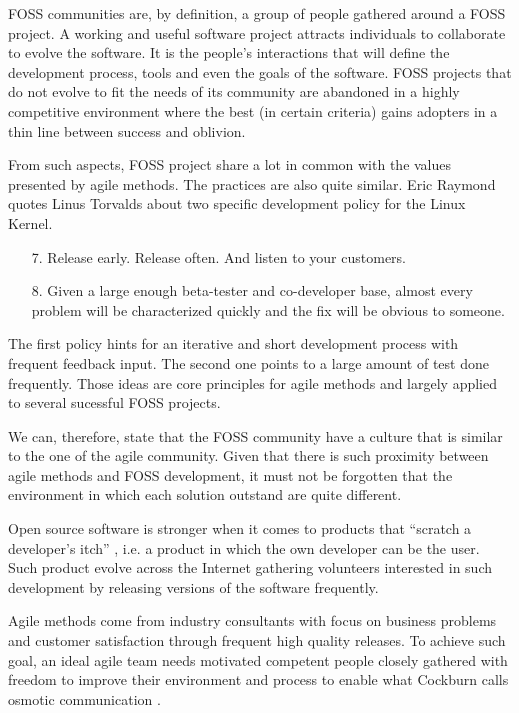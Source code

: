 \documentclass[lnbip]{svmultln}
\begin{document}
FOSS communities are, by definition, a group of people gathered around
a FOSS project. A working and useful software project attracts
individuals to collaborate to evolve the
software\cite{crowston2002}. It is the people's interactions that will
define the development process, tools and even the goals of the
software. FOSS projects that do not evolve to fit the needs of its
community are abandoned in a highly competitive environment where the
best (in certain criteria) gains adopters in a thin line between
success and oblivion.

From such aspects, FOSS project share a lot in common with the values
presented by agile methods. The practices are also quite similar. Eric
Raymond quotes Linus Torvalds about two specific development policy
for the Linux Kernel.
\begin{enumerate}
\item[7.] Release early. Release often. And listen to your customers.
\item[8.] Given a large enough beta-tester and co-developer base,
  almost every problem will be characterized quickly and the fix will
  be obvious to someone.
\end{enumerate}

The first policy hints for an iterative and short development process
with frequent feedback input. The second one points to a large amount
of test done frequently. Those ideas are core principles for agile
methods and largely applied to several sucessful FOSS projects.

We can, therefore, state that the FOSS community have a culture that
is similar to the one of the agile community. Given that there is such
proximity between agile methods and FOSS development, it must not be
forgotten that the environment in which each solution outstand are
quite different.

Open source software is stronger when it comes to products that
``scratch a developer's itch'' \cite{fitzgerald2000}, i.e. a product
in which the own developer can be the user. Such product evolve across
the Internet gathering volunteers interested in such development by
releasing versions of the software frequently.

Agile methods come from industry consultants with focus on business
problems and customer satisfaction through frequent high quality
releases. To achieve such goal, an ideal agile team needs motivated
competent people closely gathered with freedom to improve their
environment and process to enable what Cockburn calls osmotic
communication \cite{cockburn2004}.
\end{document}
